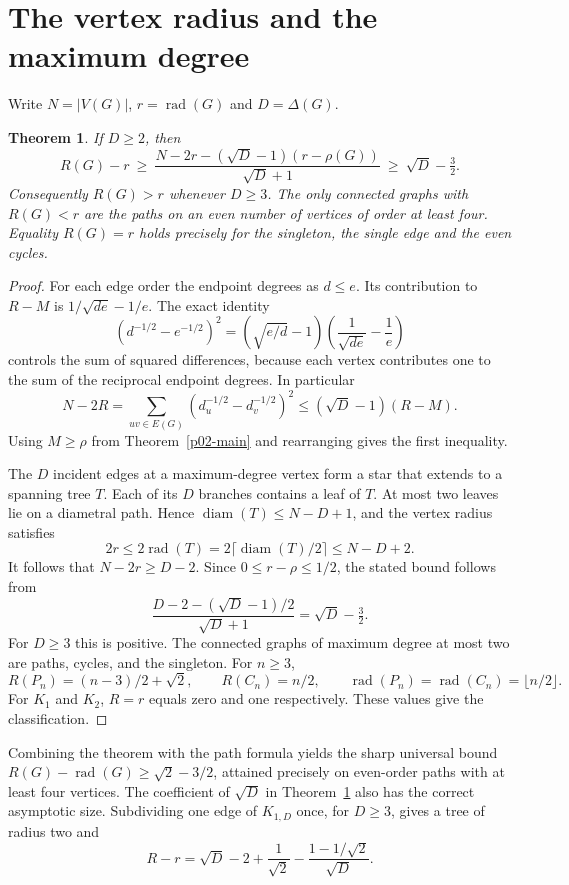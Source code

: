 \documentclass[11pt,a4paper]{article}
\newtheorem{theorem}{Theorem}[section]
\newcommand{\rad}{\operatorname{rad}}\newcommand{\diam}{\operatorname{diam}}
\begin{document}
\section{The vertex radius and the maximum degree}
Write $N=|V(G)|$, $r=\rad(G)$ and $D=\Delta(G)$.
\begin{theorem}\label{p02-ch}
If $D\ge2$, then
\[
 R(G)-r\ \ge\
 \frac{N-2r-(\sqrt D-1)(r-\rho(G))}{\sqrt D+1}
 \ \ge\ \sqrt D-\tfrac32 .
\]
Consequently $R(G)>r$ whenever $D\ge3$. The only connected graphs
with $R(G)<r$ are the paths on an even number of vertices of order
at least four. Equality $R(G)=r$ holds precisely for the singleton,
the single edge and the even cycles.
\end{theorem}
\begin{proof}
For each edge order the endpoint degrees as $d\le e$. Its contribution
to $R-M$ is $1/\sqrt{de}-1/e$. The exact identity
\[
 (d^{-1/2}-e^{-1/2})^2
  =(\sqrt{e/d}-1)\left(\frac1{\sqrt{de}}-\frac1e\right)
\]
controls the sum of squared differences, because each vertex contributes
one to the sum of the reciprocal endpoint degrees. In particular
\[
 N-2R=\sum_{uv\in E(G)}(d_u^{-1/2}-d_v^{-1/2})^2
       \le (\sqrt D-1)(R-M).
\]
Using $M\ge\rho$ from Theorem~\ref{p02-main} and rearranging gives the first inequality.

The $D$ incident edges at a maximum-degree vertex form a star that extends
to a spanning tree $T$. Each of its $D$ branches contains a leaf of $T$.
At most two leaves lie on a diametral path. Hence
$\diam(T)\le N-D+1$, and the vertex radius satisfies
\[
 2r\le 2\rad(T)=2\lceil\diam(T)/2\rceil\le N-D+2 .
\]
It follows that $N-2r\ge D-2$. Since $0\le r-\rho\le1/2$, the stated
bound follows from
\[
 \frac{D-2-(\sqrt D-1)/2}{\sqrt D+1}=\sqrt D-\tfrac32 .
\]
For $D\ge3$ this is positive. The connected graphs of maximum degree
at most two are paths, cycles, and the singleton. For $n\ge3$,
\[
 R(P_n)=(n-3)/2+\sqrt2,\qquad R(C_n)=n/2,\qquad
 \rad(P_n)=\rad(C_n)=\lfloor n/2\rfloor .
\]
For $K_1$ and $K_2$, $R=r$ equals zero and one respectively.
These values give the classification.
\end{proof}

Combining the theorem with the path formula yields the sharp universal bound
$R(G)-\rad(G)\ge\sqrt2-3/2$, attained precisely on even-order paths
with at least four vertices. The coefficient of $\sqrt D$ in
Theorem~\ref{p02-ch} also has the correct asymptotic size. Subdividing one
edge of $K_{1,D}$ once, for $D\ge3$, gives a tree of radius two and
\[
 R-r=\sqrt D-2+\frac1{\sqrt2}
         -\frac{1-1/\sqrt2}{\sqrt D}.
\]
\end{document}
